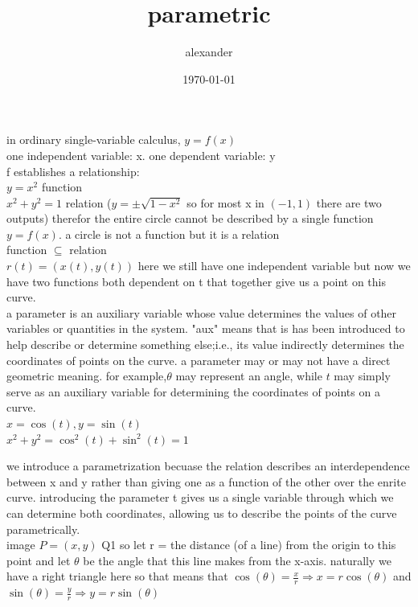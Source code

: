 \documentclass{article}
\author{alexander}
\date{\today}
\title{parametric}
\begin{document}
\maketitle


in ordinary single-variable calculus, $y = f(x)$\\
one independent variable: x. one dependent variable: y\\
f establishes a relationship:\\
$y = x^2$ function\\
$x^2 + y^2 = 1$ relation ($y = \pm\sqrt{1-x^2}$ so for most x in $(-1, 1)$ there are two outputs) therefor the entire circle cannot be described by a single function $y = f(x)$. a circle is not a function but it is a relation\\

function $\subseteq$ relation\\

$r(t) = (x(t), y(t))$ here we still have one independent variable but now we have two functions both dependent on t that together give us a point on this curve.\\

a parameter is an auxiliary variable whose value determines the values of other variables or quantities in  the system. "aux" means that is has been introduced to help describe or determine something else;i.e., its value indirectly determines the coordinates of points on the curve. a parameter may or may not have a direct geometric meaning. for example,$\theta$ may represent an angle, while $t$ may simply serve as an auxiliary variable for determining the coordinates of points on a curve.\\

$x = \cos(t), y = \sin(t)$\\
$x^2 + y^2 = \cos^2(t) + \sin^2(t) = 1$

we introduce a parametrization becuase the relation describes an interdependence between x and y rather than giving one as a function of the other over the enrite curve. introducing the parameter t gives us a single variable through which we can determine both coordinates, allowing us to describe the points of the curve parametrically.\\

image $P = (x, y)$ Q1 so let r = the distance (of a line) from the origin to this point and let $\theta$ be the angle that this line makes from the x-axis. naturally we have a right triangle here so that means that $\cos(\theta) = \frac{x}{r} \Rightarrow x = r\cos(\theta)$ and $\sin(\theta) = \frac{y}{r} \Rightarrow y = r\sin(\theta)$\\
\end{document}

